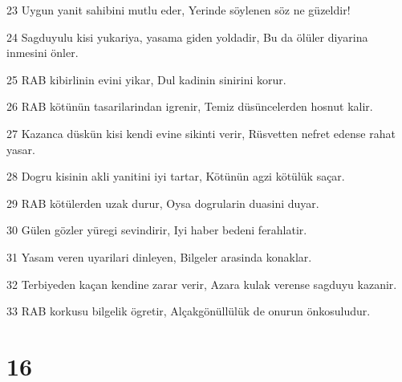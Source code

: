 \par 23 Uygun yanit sahibini mutlu eder, Yerinde söylenen söz ne güzeldir!
\par 24 Sagduyulu kisi yukariya, yasama giden yoldadir, Bu da ölüler diyarina inmesini önler.
\par 25 RAB kibirlinin evini yikar, Dul kadinin sinirini korur.
\par 26 RAB kötünün tasarilarindan igrenir, Temiz düsüncelerden hosnut kalir.
\par 27 Kazanca düskün kisi kendi evine sikinti verir, Rüsvetten nefret edense rahat yasar.
\par 28 Dogru kisinin akli yanitini iyi tartar, Kötünün agzi kötülük saçar.
\par 29 RAB kötülerden uzak durur, Oysa dogrularin duasini duyar.
\par 30 Gülen gözler yüregi sevindirir, Iyi haber bedeni ferahlatir.
\par 31 Yasam veren uyarilari dinleyen, Bilgeler arasinda konaklar.
\par 32 Terbiyeden kaçan kendine zarar verir, Azara kulak verense sagduyu kazanir.
\par 33 RAB korkusu bilgelik ögretir, Alçakgönüllülük de onurun önkosuludur.

\chapter{16}

